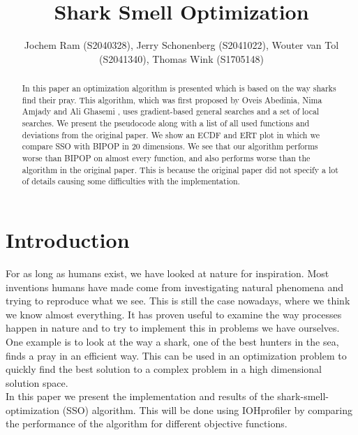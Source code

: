 \documentclass[runningheads]{llncs}
\begin{document}
%
\title{Shark Smell Optimization}
%

%
\author{Jochem Ram (S2040328), Jerry Schonenberg (S2041022), Wouter van Tol (S2041340), Thomas Wink (S1705148)}
%


%
%
\maketitle              %
%


\begin{abstract}
In this paper an optimization algorithm is presented which is based on the way sharks find their pray. This algorithm, which was first proposed by Oveis Abedinia, Nima Amjady and Ali Ghasemi \cite{abedinia2014shark}, uses gradient-based general searches and a set of local searches. We present the pseudocode along with a list of all used functions and deviations from the original paper. We show an ECDF and ERT plot in which we compare SSO with BIPOP \cite{COCOperformace} in 20 dimensions. We see that our algorithm performs worse than BIPOP on almost every function, and also performs worse than the algorithm in the original paper. This is because the original paper did not specify a lot of details causing some difficulties with the implementation. 
\end{abstract}





\section{Introduction}
For as long as humans exist, we have looked at nature for inspiration. Most inventions humans have made come from investigating natural phenomena and trying to reproduce what we see. This is still the case nowadays, where we think we know almost everything. It has proven useful to examine the way processes happen in nature and to try to implement this in problems we have ourselves. One example is to look at the way a shark, one of the best hunters in the sea, finds a pray in an efficient way. This can be used in an optimization problem to quickly find the best solution to a complex problem in a high dimensional solution space.\\
In this paper we present the implementation and results of the shark-smell-optimization (SSO) \cite{abedinia2014shark} algorithm. This will be done using IOHprofiler \cite{IOHprofiler} by comparing the performance of the algorithm for different objective functions.
\end{document}
